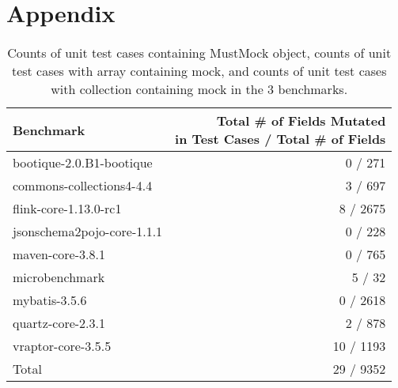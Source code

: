 \section*{Appendix}
\label{sec:appendix}

\begin{table*}[b]
	\centering
	\caption{Counts of unit test cases containing MustMock object, counts of unit test cases with array containing mock, and counts of unit test cases with collection containing mock in the 3 benchmarks.}
	\begin{tabular}{lr}
		\toprule
		Benchmark &  \thead{ Total \# of Fields Mutated \\ in Test Cases / Total \#  of Fields} \\
		\midrule
		bootique-2.0.B1-bootique           			&  0 / 271       \\
		commons-collections4-4.4           			&  3 / 697       \\
		flink-core-1.13.0-rc1           			&  8 / 2675       \\
		jsonschema2pojo-core-1.1.1           		&  0 / 228       \\
		maven-core-3.8.1           					&  0 / 765       \\
		microbenchmark           					&  5 / 32       \\
		mybatis-3.5.6           					&  0 / 2618       \\
		quartz-core-2.3.1           				&  2 / 878       \\
		vraptor-core-3.5.5           				&  10 / 1193       \\
		\bottomrule
		Total           				&  29 / 9352       \\
	\end{tabular}
	\label{tab:mocks}
\end{table*}
